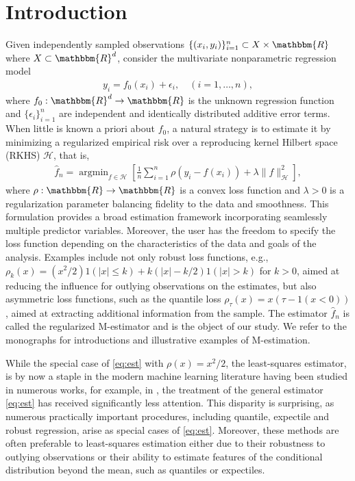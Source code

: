 \documentclass[11pt]{article}
\theoremstyle{definition}
\theoremstyle{remark}
\DeclareMathOperator*{\argmin}{argmin}
\begin{document}
\section{Introduction}
Given independently sampled observations $\{(x_i,y_i)\}_{i=1}^n\subset X \times \mathbbm{R}$ where $X \subset \mathbbm{R}^d$, consider the  multivariate nonparametric regression model
\begin{align}
\label{eq:npm}
y_i = f_0(x_i) + \epsilon_i, \quad (i=1, \ldots, n),
\end{align}
where $f_0: \mathbbm{R}^d \to \mathbbm{R}$ is the unknown regression function and $\{\epsilon_i\}_{i=1}^n$ are independent and identically distributed additive error terms. When little is known a priori about $f_0$, a natural strategy is to estimate it by minimizing a regularized empirical risk over a reproducing kernel Hilbert space (RKHS) $\mathcal{H}$, that is,
\begin{align}
\label{eq:est}
\widehat{f}_n = \argmin_{f \in \mathcal{H}} \left[ \frac{1}{n} \sum_{i=1}^n \rho(y_i - f(x_i)) + \lambda \|f\|_{\mathcal{H}}^2 \right],
\end{align}
where $\rho: \mathbbm{R} \to \mathbbm{R}$ is a convex loss function and $\lambda > 0$ is a regularization parameter balancing fidelity to the data and smoothness. This formulation provides a broad estimation framework incorporating seamlessly multiple predictor variables. Moreover, the user has the freedom to specify the loss function depending on the characteristics of the data and goals of the analysis. Examples include not only robust loss functions, e.g., $\rho_k(x) = (x^2/2)1(|x| \leq k) + k(|x|-k/2)1(|x|>k)$ for $k>0$, aimed at reducing the influence for outlying observations on the estimates, but also asymmetric loss functions, such as the quantile loss $\rho_{\tau}(x) = x(\tau-1(x<0))$, aimed at extracting additional information from the sample. The estimator $\widehat{f}_n$ is called the regularized M-estimator and is the object of our study. We refer to the monographs \citep{Huber:2009,Mar:2019} for introductions and illustrative examples of M-estimation.

While the special case of \eqref{eq:est} with $\rho(x) = x^2/2$, the least-squares estimator, is by now a staple in the modern machine learning literature having been studied in numerous works, for example, in \citep{Cucker:2005, C:2007, St:2012, Fischer:2020, Zhang:2023}, the treatment of the general estimator \eqref{eq:est} has received significantly less attention. This disparity is surprising, as numerous practically important procedures, including quantile, expectile and robust regression, arise as special cases of \eqref{eq:est}. Moreover, these methods are often preferable to least-squares estimation either due to their robustness to outlying observations or their ability to estimate features of the conditional distribution beyond the mean, such as quantiles or expectiles.
\end{document}
